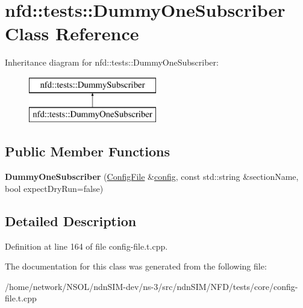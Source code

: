 \hypertarget{classnfd_1_1tests_1_1DummyOneSubscriber}{}\section{nfd\+:\+:tests\+:\+:Dummy\+One\+Subscriber Class Reference}
\label{classnfd_1_1tests_1_1DummyOneSubscriber}
Inheritance diagram for nfd\+:\+:tests\+:\+:Dummy\+One\+Subscriber\+:\begin{figure}[H]
\begin{center}
\leavevmode
\includegraphics[height=2.000000cm]{classnfd_1_1tests_1_1DummyOneSubscriber}
\end{center}
\end{figure}
\subsection*{Public Member Functions}
\begin{DoxyCompactItemize}
\item 
{\bfseries Dummy\+One\+Subscriber} (\hyperlink{classnfd_1_1ConfigFile}{Config\+File} \&\hyperlink{classconfig}{config}, const std\+::string \&section\+Name, bool expect\+Dry\+Run=false)\hypertarget{classnfd_1_1tests_1_1DummyOneSubscriber_a5b5214ac98d99a699901ab76f4807ab9}{}\label{classnfd_1_1tests_1_1DummyOneSubscriber_a5b5214ac98d99a699901ab76f4807ab9}

\end{DoxyCompactItemize}


\subsection{Detailed Description}


Definition at line 164 of file config-\/file.\+t.\+cpp.



The documentation for this class was generated from the following file\+:\begin{DoxyCompactItemize}
\item 
/home/network/\+N\+S\+O\+L/ndn\+S\+I\+M-\/dev/ns-\/3/src/ndn\+S\+I\+M/\+N\+F\+D/tests/core/config-\/file.\+t.\+cpp\end{DoxyCompactItemize}

